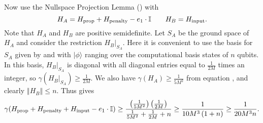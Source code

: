 \documentclass[../thesis-main/thesis-main]{subfiles}
\begin{document}
Now use the Nullspace Projection Lemma () with 
\begin{equation}
H_{A}=H_{\text{prop}}+H_{\text{penalty}}-e_{1}\cdot\mathbb{I}\qquad H_{B}=H_{\text{input}}.
\end{equation}
Note that $H_{A}$ and $H_{B}$ are positive semidefinite. Let $S_{A}$ be the ground space of $H_{A}$ and consider the restriction $H_{B}|_{S_{A}}$. Here it is convenient to use the basis for $S_{A}$ given by  and  with $|\phi\rangle$ ranging over the computational basis states of $n$ qubits. In this basis, $H_{B}|_{S_{A}}$ is diagonal with all diagonal entries equal to $\frac{1}{2M}$ times an integer, so $\gamma(H_{B}|_{S_{A}})\geq\frac{1}{2M}$. We also have $\gamma(H_{A})\geq\frac{1}{5M^{2}}$ from equation , and clearly $\left\Vert H_{B}\right\Vert \leq n$. Thus  gives
\begin{equation}
\gamma(H_{\text{prop}}+H_{\text{penalty}}+H_{\text{input}}-e_{1}\cdot\mathbb{I})\geq\frac{\left(\frac{1}{5M^{2}}\right)\left(\frac{1}{2M}\right)}{\frac{1}{5M^{2}}+\frac{1}{2M}+n}\geq\frac{1}{10M^{3}\left(1+n\right)}\geq\frac{1}{20M^{3}n}.\label{eq:lowerbound_uptoinput}
\end{equation}
\end{document}
